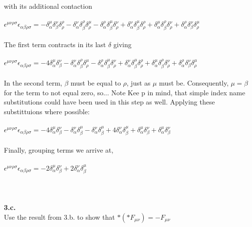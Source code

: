 \documentclass[prb,preprint]
{revtex4-1}
\newcommand{\PRLsep}{\noindent\makebox[\linewidth]{\resizebox{0.8888\linewidth}{2pt}{$\bullet$}}\bigskip}
\begin{document}
\\
\\
with its additional contaction
\\
\\
$\epsilon^{\mu\nu\rho\sigma}\epsilon_{\alpha\beta\rho\sigma} = -\delta^\mu_\alpha \delta^\nu_\beta \delta^\rho_\rho - \delta^\nu_\alpha \delta^\rho_\beta \delta^\mu_\rho - \delta^\rho_\alpha \delta^\mu_\beta \delta^\nu_\rho + \delta^\nu_\alpha \delta^\mu_\beta \delta^\rho_\rho + \delta^\mu_\alpha \delta^\rho_\beta \delta^\nu_\rho + \delta^\rho_\alpha \delta^\nu_\beta \delta^\mu_\rho$
\\
\\
The first term contracts in its last $\delta$ giving 
\\
\\
$\epsilon^{\mu\nu\rho\sigma}\epsilon_{\alpha\beta\rho\sigma} = -4\delta^\mu_\alpha \delta^\nu_\beta - \delta^\nu_\alpha \delta^\rho_\beta \delta^\mu_\rho - \delta^\rho_\alpha \delta^\mu_\beta \delta^\nu_\rho + \delta^\nu_\alpha \delta^\mu_\beta \delta^\rho_\rho + \delta^\mu_\alpha \delta^\rho_\beta \delta^\nu_\rho + \delta^\rho_\alpha \delta^\nu_\beta \delta^\mu_\rho$
\\
\\
In the second term, $\beta$ must be equal to $\rho$, just as $\mu$ must be.  Consequently, $\mu = \beta$ for the term to not equal zero, so...  Note Kee p in mind, that simple index name substitutions could have been used in this step as well.  Applying these substittuions where possible:
\\
\\
$\epsilon^{\mu\nu\rho\sigma}\epsilon_{\alpha\beta\rho\sigma} = -4\delta^\mu_\alpha \delta^\nu_\beta - \delta^\nu_\alpha \delta^\mu_\beta - \delta^\nu_\alpha \delta^\mu_\beta + 4\delta^\nu_\alpha \delta^\mu_\beta + \delta^\mu_\alpha \delta^\nu_\beta + \delta^\mu_\alpha \delta^\nu_\beta$
\\
\\
Finally, grouping terms we arrive at,
\\
\\
$\epsilon^{\mu\nu\rho\sigma}\epsilon_{\alpha\beta\rho\sigma} = -2\delta^\mu_\alpha \delta^\nu_\beta + 2\delta^\nu_\alpha \delta^\mu_\beta$
\\
\\
\PRLsep
\\
\\
\newpage
\textbf{3.c.}
\\
Use the result from 3.b. to show that $*\left(*F_{\mu\nu}\right) = -F_{\mu\nu}$
\end{document}
